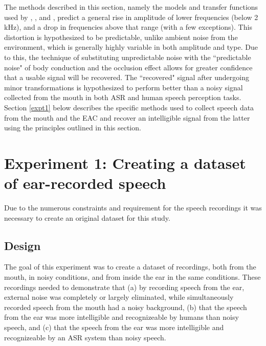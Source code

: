 \documentclass[dissertation,copyright]{uathesis}
\begin{document}


The methods described in this section, namely the models and transfer functions used by \cite{hansen:97b}, \cite{stenfelt:07}, and \cite{reinfeldt:10}, predict a general rise in amplitude of lower frequencies (below 2 kHz), and a drop in frequencies above that range (with a few exceptions).  This distortion is hypothesized to be predictable, unlike ambient noise from the environment, which is generally highly variable in both amplitude and type.  Due to this, the technique of substituting unpredictable noise with the ``predictable noise" of body conduction and the occlusion effect allows for greater confidence that a usable signal will be recovered.  The ``recovered" signal after undergoing minor transformations is hypothesized to perform better than a noisy signal collected from the mouth in both ASR and human speech perception tasks.  Section \ref{expt1} below describes the specific methods used to collect speech data from the mouth and the EAC and recover an intelligible signal from the latter using the principles outlined in this section.


\section{Experiment 1: Creating a dataset of ear-recorded speech\label{expt1}}

Due to the numerous constraints and requirement for the speech recordings it was necessary to create an original dataset for this study. 

\subsection{Design}
   
The goal of this experiment was to create a dataset of recordings, both from the mouth, in noisy conditions, and from inside the ear in the same conditions.  These recordings needed to demonstrate that (a) by recording speech from the ear, external noise was completely or largely eliminated, while simultaneously recorded speech from the mouth had a noisy background, (b) that the speech from the ear was more intelligible and recognizeable by humans than noisy speech, and (c) that the speech from the ear was more intelligible and recognizeable by an ASR system than noisy speech. 
\end{document}
